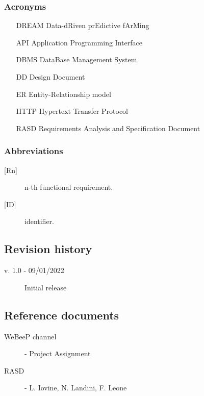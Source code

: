 \subsubsection{Acronyms}
\begin{itemize}
    \item [DREAM] Data-dRiven prEdictive fArMing
    \item [API] Application Programming Interface
    \item [DBMS] DataBase Management System
    \item [DD] Design Document
    \item [ER] Entity-Relationship model
    \item [HTTP] Hypertext Transfer Protocol
    \item [RASD] Requirements Analysis and Specification Document
\end{itemize}

\subsubsection{Abbreviations}
\begin{description}
    \item [{[Rn]}] n-th functional requirement.
    \item [{[ID]}] identifier.
\end{description}

\subsection{Revision history}
\begin{description}
    \item[v. 1.0 - 09/01/2022] Initial release
\end{description}

\subsection{Reference documents}
\begin{description}
    \item [WeBeeP channel] - Project Assignment
    \item [RASD] - L. Iovine, N. Landini, F. Leone
\end{description}


